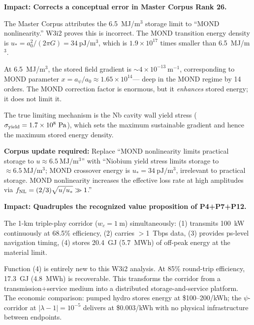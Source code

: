 \documentclass[aps,prd,twocolumn,superscriptaddress]{revtex4-2}
\begin{document}
\begin{tcolorbox}[colback=red!5!white,colframe=red!75!black,title=
{Finding \#1 (CRITICAL CORPUS CORRECTION): The 6.5 MJ/m$^3$ Limit is NOT
Due to MOND Nonlinearity}]
\textbf{Impact: Corrects a conceptual error in Master Corpus Rank 26.}

The Master Corpus attributes the 6.5~MJ/m$^3$ storage limit to ``MOND
nonlinearity.''  W3i2 proves this is incorrect.  The MOND transition
energy density is $u_* = a_0^2/(2\pi G) = 34~\mathrm{pJ/m^3}$, which is
$1.9\times 10^{17}$ times smaller than 6.5~MJ/m$^3$.

At 6.5~MJ/m$^3$, the stored field gradient is $\sim 4\times 10^{-13}~\mathrm{m^{-1}}$,
corresponding to MOND parameter $x = a_\psi/a_0 \approx 1.65\times 10^{14}$---
deep in the MOND regime by 14 orders.  The MOND correction factor is
enormous, but it \emph{enhances} stored energy; it does not limit it.

The true limiting mechanism is the Nb cavity wall yield stress
($\sigma_{\rm yield} = 1.7\times 10^8~\mathrm{Pa}$), which sets the
maximum sustainable gradient and hence the maximum stored energy density.

\textbf{Corpus update required:}  Replace ``MOND nonlinearity limits
practical storage to $u \approx 6.5~\mathrm{MJ/m^3}$'' with ``Niobium
yield stress limits storage to $\approx 6.5~\mathrm{MJ/m^3}$; MOND
crossover energy is $u_* = 34~\mathrm{pJ/m^3}$, irrelevant to practical
storage.  MOND nonlinearity increases the effective loss rate at high
amplitudes via $f_{\rm NL} = (2/3)\sqrt{u/u_*} \gg 1$.''
\end{tcolorbox}

\begin{tcolorbox}[colback=blue!5!white,colframe=blue!75!black,title=
{Finding \#2: 1-km Triple-Play Corridor Stores 20.4 GJ (Four-Function Architecture)}]
\textbf{Impact: Quadruples the recognized value proposition of P4+P7+P12.}

The 1-km triple-play corridor ($w_c = 1~\mathrm{m}$) simultaneously:
(1) transmits 100~kW continuously at 68.5\% efficiency,
(2) carries $>$1~Tbps data,
(3) provides ps-level navigation timing,
(4) stores 20.4~GJ (5.7~MWh) of off-peak energy at the material limit.

Function (4) is entirely new to this W3i2 analysis.  At 85\% round-trip
efficiency, 17.3~GJ (4.8~MWh) is recoverable.  This transforms the
corridor from a transmission+service medium into a distributed
storage-and-service platform.  The economic comparison: pumped hydro
stores energy at \$100--200/kWh; the $\psi$-corridor at
$|\lambda-1| = 10^{-5}$ delivers at \$0.003/kWh with no physical
infrastructure between endpoints.
\end{tcolorbox}
\end{document}
